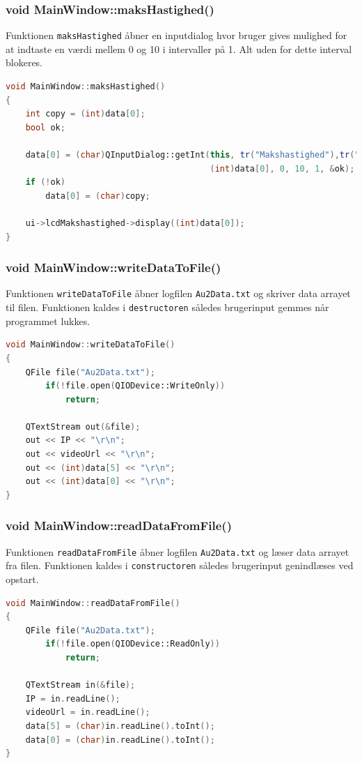 \subsubsection{void MainWindow::maksHastighed()}
Funktionen \texttt{maksHastighed} åbner en inputdialog hvor bruger gives mulighed for at indtaste en værdi mellem 0 og 10 i intervaller på 1. Alt uden for dette interval blokeres.  
\begin{lstlisting}[caption={maksHastighed},label=lst:maksHastighed, language=c++]
void MainWindow::maksHastighed()
{
    int copy = (int)data[0];
    bool ok;

    data[0] = (char)QInputDialog::getInt(this, tr("Makshastighed"),tr("Indtast makshastigheden"),
                                         (int)data[0], 0, 10, 1, &ok);
    if (!ok)
        data[0] = (char)copy;

    ui->lcdMakshastighed->display((int)data[0]);
}
\end{lstlisting}

\subsubsection{void MainWindow::writeDataToFile()}
Funktionen \texttt{writeDataToFile} åbner logfilen \texttt{Au2Data.txt} og skriver data arrayet til filen. Funktionen kaldes i \texttt{destructoren} således brugerinput gemmes når programmet lukkes. 
\begin{lstlisting}[caption={writeDataToFile},label=lst:writeDataToFile, language=c++]
void MainWindow::writeDataToFile()
{
    QFile file("Au2Data.txt");
        if(!file.open(QIODevice::WriteOnly))
            return;

    QTextStream out(&file);
    out << IP << "\r\n";
    out << videoUrl << "\r\n";
    out << (int)data[5] << "\r\n";
    out << (int)data[0] << "\r\n";
}
\end{lstlisting}

\subsubsection{void MainWindow::readDataFromFile()}
Funktionen \texttt{readDataFromFile} åbner logfilen \texttt{Au2Data.txt} og læser data arrayet fra filen. Funktionen kaldes i \texttt{constructoren} således brugerinput genindlæses ved opstart. 
\begin{lstlisting}[caption={readDataFromFile},label=lst:readDataFromFile, language=c++]
void MainWindow::readDataFromFile()
{
    QFile file("Au2Data.txt");
        if(!file.open(QIODevice::ReadOnly))
            return;

    QTextStream in(&file);
    IP = in.readLine();
    videoUrl = in.readLine();
    data[5] = (char)in.readLine().toInt();
    data[0] = (char)in.readLine().toInt();
}
\end{lstlisting}

